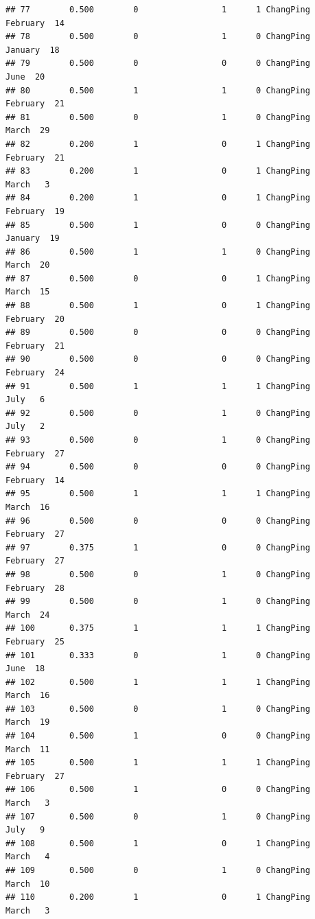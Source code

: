\documentclass[
]{article}
\begin{document}
\begin{verbatim}
## 77        0.500        0                 1      1 ChangPing  February  14
## 78        0.500        0                 1      0 ChangPing   January  18
## 79        0.500        0                 0      0 ChangPing      June  20
## 80        0.500        1                 1      0 ChangPing  February  21
## 81        0.500        0                 1      0 ChangPing     March  29
## 82        0.200        1                 0      1 ChangPing  February  21
## 83        0.200        1                 0      1 ChangPing     March   3
## 84        0.200        1                 0      1 ChangPing  February  19
## 85        0.500        1                 0      0 ChangPing   January  19
## 86        0.500        1                 1      0 ChangPing     March  20
## 87        0.500        0                 0      1 ChangPing     March  15
## 88        0.500        1                 0      1 ChangPing  February  20
## 89        0.500        0                 0      0 ChangPing  February  21
## 90        0.500        0                 0      0 ChangPing  February  24
## 91        0.500        1                 1      1 ChangPing      July   6
## 92        0.500        0                 1      0 ChangPing      July   2
## 93        0.500        0                 1      0 ChangPing  February  27
## 94        0.500        0                 0      0 ChangPing  February  14
## 95        0.500        1                 1      1 ChangPing     March  16
## 96        0.500        0                 0      0 ChangPing  February  27
## 97        0.375        1                 0      0 ChangPing  February  27
## 98        0.500        0                 1      0 ChangPing  February  28
## 99        0.500        0                 1      0 ChangPing     March  24
## 100       0.375        1                 1      1 ChangPing  February  25
## 101       0.333        0                 1      0 ChangPing      June  18
## 102       0.500        1                 1      1 ChangPing     March  16
## 103       0.500        0                 1      0 ChangPing     March  19
## 104       0.500        1                 0      0 ChangPing     March  11
## 105       0.500        1                 1      1 ChangPing  February  27
## 106       0.500        1                 0      0 ChangPing     March   3
## 107       0.500        0                 1      0 ChangPing      July   9
## 108       0.500        1                 0      1 ChangPing     March   4
## 109       0.500        0                 1      0 ChangPing     March  10
## 110       0.200        1                 0      1 ChangPing     March   3

\end{verbatim}
\end{document}
